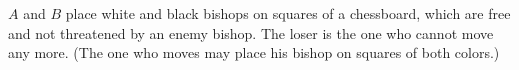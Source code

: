 $A$ and $B$ place white and black bishops on squares of a chessboard, which are free and not threatened by an enemy bishop. The loser is the one who cannot move any more. (The one who moves may place his bishop on squares of both colors.)
